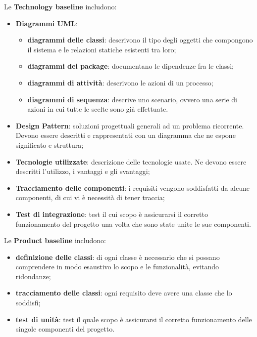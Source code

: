 Le \textbf{Technology baseline} includono:
\begin{itemize}
\item \textbf{Diagrammi UML}:
\begin{itemize}
\item \textbf{diagrammi delle classi}: descrivono il tipo degli oggetti che compongono il sistema e le relazioni statiche esistenti tra loro;
\item \textbf{diagrammi dei package}: documentano le dipendenze fra le classi;
\item \textbf{diagrammi di attività}: descrivono le azioni di un processo;
\item \textbf{diagrammi di sequenza}: descrive uno scenario, ovvero una serie di azioni in cui tutte le scelte sono già effettuate.
\end{itemize}
\item \textbf{Design Pattern}: soluzioni progettuali generali ad un problema ricorrente. Devono essere descritti e rappresentati con un diagramma che ne espone significato e struttura;
\item \textbf{Tecnologie utilizzate}: descrizione delle tecnologie usate. Ne devono essere descritti l'utilizzo, i vantaggi e gli svantaggi;
\item \textbf{Tracciamento delle componenti}: i requisiti vengono soddisfatti da alcune componenti, di cui vi è necessità di tener traccia;
\item \textbf{Test di integrazione}: test il cui scopo è assicurarsi il corretto funzionamento del progetto una volta che sono state unite le sue componenti.
\end{itemize}

Le \textbf{Product baseline} includono:
\begin{itemize}
\item \textbf{definizione delle classi}: di ogni classe è necessario che si possano comprendere in modo esaustivo lo scopo e le funzionalità, evitando ridondanze;
\item \textbf{tracciamento delle classi}: ogni requisito deve avere una classe che lo soddisfi; 
\item \textbf{test di unità}: test il quale scopo è assicurarsi il corretto funzionamento delle singole componenti del progetto.
\end{itemize}